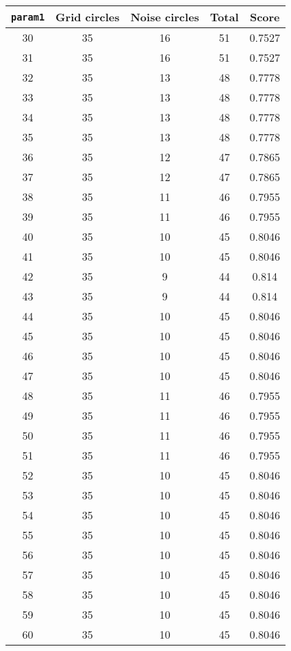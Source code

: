 \documentclass[letterpaper, 12pt]{article}
\begin{document}
\begin{longtable}{|c|c|c|c|c|}
\hline
\textbf{\texttt{param1}} & \textbf{Grid circles} & \textbf{Noise circles} & \textbf{Total} & \textbf{Score} \\
\hline
30 & 35 & 16 & 51 & 0.7527 \\
\hline
31 & 35 & 16 & 51 & 0.7527 \\
\hline
32 & 35 & 13 & 48 & 0.7778 \\
\hline
33 & 35 & 13 & 48 & 0.7778 \\
\hline
34 & 35 & 13 & 48 & 0.7778 \\
\hline
35 & 35 & 13 & 48 & 0.7778 \\
\hline
36 & 35 & 12 & 47 & 0.7865 \\
\hline
37 & 35 & 12 & 47 & 0.7865 \\
\hline
38 & 35 & 11 & 46 & 0.7955 \\
\hline
39 & 35 & 11 & 46 & 0.7955 \\
\hline
40 & 35 & 10 & 45 & 0.8046 \\
\hline
41 & 35 & 10 & 45 & 0.8046 \\
\hline
42 & 35 & 9 & 44 & 0.814 \\
\hline
43 & 35 & 9 & 44 & 0.814 \\
\hline
44 & 35 & 10 & 45 & 0.8046 \\
\hline
45 & 35 & 10 & 45 & 0.8046 \\
\hline
46 & 35 & 10 & 45 & 0.8046 \\
\hline
47 & 35 & 10 & 45 & 0.8046 \\
\hline
48 & 35 & 11 & 46 & 0.7955 \\
\hline
49 & 35 & 11 & 46 & 0.7955 \\
\hline
50 & 35 & 11 & 46 & 0.7955 \\
\hline
51 & 35 & 11 & 46 & 0.7955 \\
\hline
52 & 35 & 10 & 45 & 0.8046 \\
\hline
53 & 35 & 10 & 45 & 0.8046 \\
\hline
54 & 35 & 10 & 45 & 0.8046 \\
\hline
55 & 35 & 10 & 45 & 0.8046 \\
\hline
56 & 35 & 10 & 45 & 0.8046 \\
\hline
57 & 35 & 10 & 45 & 0.8046 \\
\hline
58 & 35 & 10 & 45 & 0.8046 \\
\hline
59 & 35 & 10 & 45 & 0.8046 \\
\hline
60 & 35 & 10 & 45 & 0.8046 \\

\end{longtable}
\end{document}
